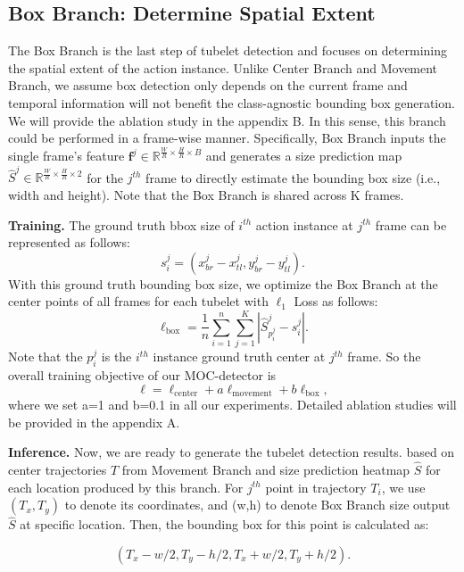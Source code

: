 \documentclass[runningheads]{llncs}
\begin{document}
\subsection{Box Branch: Determine Spatial Extent}

The Box Branch is the last step of tubelet detection and focuses on determining the spatial extent of the action instance. Unlike Center Branch and Movement Branch, we assume box detection only depends on the current frame and temporal information will not benefit the class-agnostic bounding box generation. We will provide the ablation study in the appendix B. In this sense, this branch could be performed in a frame-wise manner. Specifically, Box Branch inputs the single frame's feature $\mathbf{f}^{j} \in \mathbb{R}^{\frac{W}{R}\times\frac{H}{R} \times B}$ and generates a size prediction map $\hat{S}^j\in \mathbb{R}^{\frac{W}{R}\times\frac{H}{R} \times 2}$  for the $j^{th}$ frame to directly estimate the bounding box size (i.e., width and height). Note that the Box Branch is shared across K frames.

\textbf{Training.}
The ground truth bbox size of $i^{th}$ action instance at $j^{th}$ frame can be represented as follows:
\begin{equation}
    s_i^j = (x^{j}_{br} - x^j_{tl}, y^j_{br} - y^j_{tl}).
\end{equation}
With this ground truth bounding box size, we optimize the Box Branch at the center points of all frames for each tubelet with $\ell_1$ Loss as follows:
\begin{equation}
  \ell_{\mathrm{box}}=\frac{1}{n}\sum_{i=1}^{n} \sum_{j=1}^{K} |\hat{S}_{p_i^j}^j-s_i^j|.
\end{equation}
Note that the $p_{i}^{j}$ is the $i^{th}$ instance ground truth center at $j^{th}$ frame.
So the overall training objective of our MOC-detector is
\begin{equation}\label{loss}
\ell=\ell_{\mathrm{center}}+a\ell_{\mathrm{movement}}+b\ell_{\mathrm{box}},
\end{equation}
where we set a=1 and b=0.1 in all our experiments. Detailed ablation studies will be provided in the appendix A.

\textbf{Inference.} Now, we are ready to generate the tubelet detection results. based on center trajectories $T$ from Movement Branch and
 size prediction heatmap $\hat{S}$ for each location produced by this branch. For $j^{th}$ point in trajectory $T_i$, we use $(T_{x},T_{y})$ to denote its coordinates, and (w,h) to denote Box Branch size output $\hat{S}$ at specific location. Then, the bounding box for this point is calculated as:
 \begin{small}
 \begin{equation}
  (T_{x}-w/2,T_{y}-h/2, T_{x}+w/2,T_{y}+h/2).
 \end{equation}
\end{small}
\end{document}
